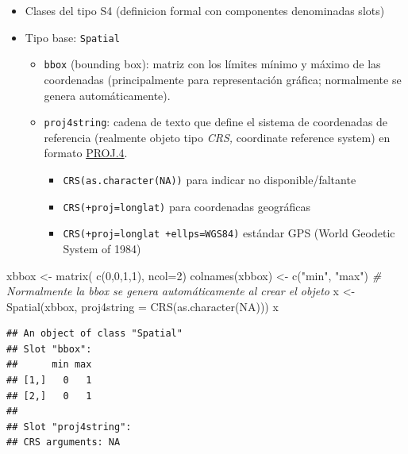 \documentclass[
  spanish,
]{book}
\newenvironment{Shaded}{\begin{snugshade}}{\end{snugshade}}
\newcommand{\AttributeTok}[1]{\textcolor[rgb]{0.77,0.63,0.00}{#1}}
\newcommand{\CommentTok}[1]{\textcolor[rgb]{0.56,0.35,0.01}{\textit{#1}}}
\newcommand{\ConstantTok}[1]{\textcolor[rgb]{0.00,0.00,0.00}{#1}}
\newcommand{\DecValTok}[1]{\textcolor[rgb]{0.00,0.00,0.81}{#1}}
\newcommand{\FunctionTok}[1]{\textcolor[rgb]{0.00,0.00,0.00}{#1}}
\newcommand{\NormalTok}[1]{#1}
\newcommand{\OtherTok}[1]{\textcolor[rgb]{0.56,0.35,0.01}{#1}}
\newcommand{\StringTok}[1]{\textcolor[rgb]{0.31,0.60,0.02}{#1}}
\theoremstyle{break}
\begin{document}
\begin{itemize}
\item
  Clases del tipo S4 (definicion formal con componentes
  denominadas slots)
\item
  Tipo base: \texttt{Spatial}

  \begin{itemize}
  \item
    \texttt{bbox} (bounding box): matriz con los límites mínimo y máximo de
    las coordenadas (principalmente para representación gráfica;
    normalmente se genera automáticamente).
  \item
    \texttt{proj4string}: cadena de texto que define el sistema de
    coordenadas de referencia (realmente objeto tipo \emph{CRS,}
    coordinate reference system) en formato
    \href{http://trac.osgeo.org/proj}{PROJ.4}.

    \begin{itemize}
    \item
      \texttt{CRS(as.character(NA))} para indicar no disponible/faltante
    \item
      \texttt{CRS(+proj=longlat)} para coordenadas geográficas
    \item
      \texttt{CRS(+proj=longlat\ +ellps=WGS84)} estándar GPS (World
      Geodetic System of 1984)
    \end{itemize}
  \end{itemize}
\end{itemize}

\begin{Shaded}
\begin{Highlighting}[]
\NormalTok{xbbox }\OtherTok{\textless{}{-}} \FunctionTok{matrix}\NormalTok{( }\FunctionTok{c}\NormalTok{(}\DecValTok{0}\NormalTok{,}\DecValTok{0}\NormalTok{,}\DecValTok{1}\NormalTok{,}\DecValTok{1}\NormalTok{), }\AttributeTok{ncol=}\DecValTok{2}\NormalTok{)}
\FunctionTok{colnames}\NormalTok{(xbbox) }\OtherTok{\textless{}{-}} \FunctionTok{c}\NormalTok{(}\StringTok{"min"}\NormalTok{, }\StringTok{"max"}\NormalTok{) }\CommentTok{\# Normalmente la bbox se genera automáticamente al crear el objeto}
\NormalTok{x }\OtherTok{\textless{}{-}} \FunctionTok{Spatial}\NormalTok{(xbbox, }\AttributeTok{proj4string =} \FunctionTok{CRS}\NormalTok{(}\FunctionTok{as.character}\NormalTok{(}\ConstantTok{NA}\NormalTok{)))}
\NormalTok{x}
\end{Highlighting}
\end{Shaded}

\begin{verbatim}
## An object of class "Spatial"
## Slot "bbox":
##      min max
## [1,]   0   1
## [2,]   0   1
## 
## Slot "proj4string":
## CRS arguments: NA
\end{verbatim}
\end{document}
